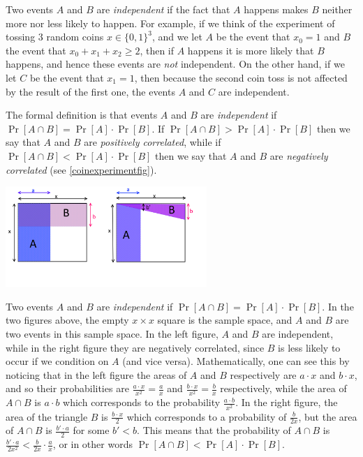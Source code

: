 Two events \(A\) and \(B\) are \emph{independent} if the fact that \(A\)
happens makes \(B\) neither more nor less likely to happen. For example,
if we think of the experiment of tossing \(3\) random coins
\(x\in \{0,1\}^3\), and we let \(A\) be the event that \(x_0=1\) and
\(B\) the event that \(x_0 + x_1 + x_2 \geq 2\), then if \(A\) happens
it is more likely that \(B\) happens, and hence these events are
\emph{not} independent. On the other hand, if we let \(C\) be the event
that \(x_1=1\), then because the second coin toss is not affected by the
result of the first one, the events \(A\) and \(C\) are independent.

The formal definition is that events \(A\) and \(B\) are
\emph{independent} if \(\Pr[A \cap B]=\Pr[A] \cdot \Pr[B]\). If
\(\Pr[A \cap B] > \Pr[A]\cdot \Pr[B]\) then we say that \(A\) and \(B\)
are \emph{positively correlated}, while if
\(\Pr[ A \cap B] < \Pr[A] \cdot \Pr[B]\) then we say that \(A\) and
\(B\) are \emph{negatively correlated} (see \cref{coinexperimentfig}).


\begin{marginfigure}
\centering
\includegraphics[width=\linewidth, height=1.5in, keepaspectratio]{../figure/independence.png}
\caption{Two events \(A\) and \(B\) are \emph{independent} if
\(\Pr[A \cap B]=\Pr[A]\cdot \Pr[B]\). In the two figures above, the
empty \(x\times x\) square is the sample space, and \(A\) and \(B\) are
two events in this sample space. In the left figure, \(A\) and \(B\) are
independent, while in the right figure they are negatively correlated,
since \(B\) is less likely to occur if we condition on \(A\) (and vice
versa). Mathematically, one can see this by noticing that in the left
figure the areas of \(A\) and \(B\) respectively are \(a\cdot x\) and
\(b\cdot x\), and so their probabilities are
\(\tfrac{a\cdot x}{x^2}=\tfrac{a}{x}\) and
\(\tfrac{b\cdot x}{x^2}=\tfrac{b}{x}\) respectively, while the area of
\(A \cap B\) is \(a\cdot b\) which corresponds to the probability
\(\tfrac{a\cdot b}{x^2}\). In the right figure, the area of the triangle
\(B\) is \(\tfrac{b\cdot x}{2}\) which corresponds to a probability of
\(\tfrac{b}{2x}\), but the area of \(A \cap B\) is
\(\tfrac{b' \cdot a}{2}\) for some \(b'<b\). This means that the
probability of \(A \cap B\) is
\(\tfrac{b'\cdot a}{2x^2} < \tfrac{b}{2x} \cdot \tfrac{a}{x}\), or in
other words \(\Pr[A \cap B ] < \Pr[A] \cdot \Pr[B]\).}
\label{independencefig}
\end{marginfigure}

